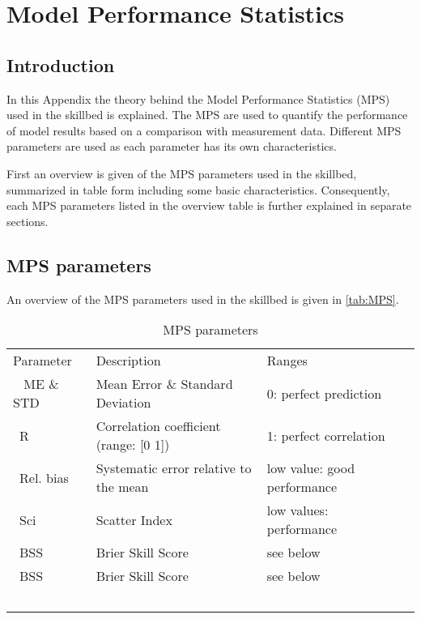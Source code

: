 \chapter{Model Performance Statistics}
\section{Introduction}

In this Appendix the theory behind the Model Performance Statistics (MPS) used in the skillbed is explained. The MPS are used to quantify the performance of model results based on a comparison with measurement data. Different MPS parameters are used as each parameter has its own characteristics. 

First an overview is given of the MPS parameters used in the skillbed, summarized in table form including some basic characteristics. Consequently, each MPS parameters listed in the overview table is further explained in separate sections.

\section{MPS parameters}

An overview of the MPS parameters used in the skillbed is given in \autoref{tab:MPS}.

\begin{table}[H]
  \centering
  \begin{table}[!tbp]
    \caption{MPS parameters\label{table}}
    \label{tab:MPS}
    \begin{center}
      \begin{tabular}{llll}\hline\hline
        Parameter & Description & Ranges\\\
        \hline
        ME \& STD & Mean Error \& Standard Deviation & 0: perfect prediction\\\
        R & Correlation coefficient (range: [0 1]) & 1: perfect correlation\\\
        Rel. bias & Systematic error relative to the mean & low value: good performance\\\
        Sci & Scatter Index & low values: performance\\\
        BSS & Brier Skill Score \citep{Sutherland2004} & see below\\\
        BSS & Brier Skill Score \citep{Murphy1989} & see below\\\
        \hline
      \end{tabular}
    \end{center}
  \end{table}
\end{table}

